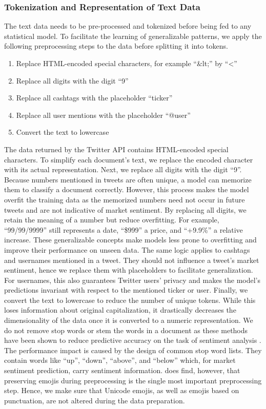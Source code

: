 \subsubsection{Tokenization and Representation of Text Data}
The text data needs to be pre-processed and tokenized before being fed to any statistical model. To facilitate the learning of generalizable patterns, we apply the following preprocessing steps to the data before splitting it into tokens.
\begin{enumerate}[noitemsep]
	\item Replace HTML-encoded special characters, for example ``\&lt;'' by ``<''
	\item Replace all digits with the digit ``9''
	\item Replace all cashtags with the placeholder ``ticker''
	\item Replace all user mentions with the placeholder ``@user''
	\item Convert the text to lowercase
\end{enumerate}

The data returned by the Twitter API contains HTML-encoded special characters. To simplify each document's text, we replace the encoded character with its actual representation. Next, we replace all digits with the digit ``9''. Because numbers mentioned in tweets are often unique, a model can memorize them to classify a document correctly. However, this process makes the model overfit the training data as the memorized numbers need not occur in future tweets and are not indicative of market sentiment. By replacing all digits, we retain the meaning of a number but reduce overfitting. For example, ``99/99/9999'' still represents a date, ``\$999'' a price, and ``+9.9\%'' a relative increase. These generalizable concepts make models less prone to overfitting and improve their performance on unseen data. The same logic applies to cashtags and usernames mentioned in a tweet. They should not influence a tweet's market sentiment, hence we replace them with placeholders to facilitate generalization. For usernames, this also guarantees Twitter users' privacy and makes the model's predictions invariant with respect to the mentioned ticker or user. Finally, we convert the text to lowercase to reduce the number of unique tokens. While this loses information about original capitalization, it drastically decreases the dimensionality of the data once it is converted to a numeric representation. We do not remove stop words or stem the words in a document as these methods have been shown to reduce predictive accuracy on the task of sentiment analysis . The performance impact is caused by the design of common stop word lists. They contain words like ``up'', ``down'', ``above'', and ``below'' which, for market sentiment prediction, carry sentiment information.  does find, however, that preserving emojis during preprocessing is the single most important preprocessing step. Hence, we make sure that Unicode emojis, as well as emojis based on punctuation, are not altered during the data preparation.

